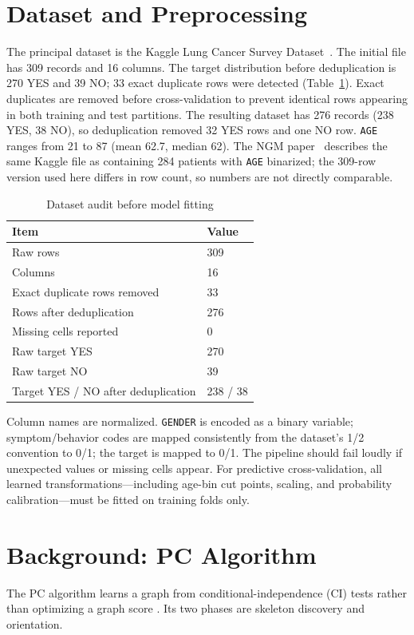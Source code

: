 \documentclass[10pt,twocolumn,letterpaper]{article}
\newcommand{\vn}[1]{{\small\texttt{#1}}}
\begin{document}
	\section{Dataset and Preprocessing}
	The principal dataset is the Kaggle Lung Cancer Survey Dataset~\cite{b2}. The initial file has 309 records and 16 columns. The target distribution before deduplication is 270 YES and 39 NO; 33 exact duplicate rows were detected (Table~\ref{tab:audit}). Exact duplicates are removed before cross-validation to prevent identical rows appearing in both training and test partitions. The resulting dataset has 276 records (238 YES, 38 NO), so deduplication removed 32 YES rows and one NO row. \vn{AGE} ranges from 21 to 87 (mean 62.7, median 62). The NGM paper~\cite{b1} describes the same Kaggle file as containing 284 patients with \vn{AGE} binarized; the 309-row version used here differs in row count, so numbers are not directly comparable.

	\begin{table}[h]\centering
		\caption{Dataset audit before model fitting}\footnotesize
		\begin{tabular}{@{}p{}p{}@{}}
			\toprule
			Item & Value\\
			\midrule
			Raw rows & 309\\
			Columns & 16\\
			Exact duplicate rows removed & 33\\
			Rows after deduplication & 276\\
			Missing cells reported & 0\\
			Raw target YES & 270\\
			Raw target NO & 39\\
			Target YES / NO after deduplication & 238 / 38\\
			\bottomrule
		\end{tabular}
		\label{tab:audit}
	\end{table}

	Column names are normalized. \vn{GENDER} is encoded as a binary variable; symptom/behavior codes are mapped consistently from the dataset's 1/2 convention to 0/1; the target is mapped to 0/1. The pipeline should fail loudly if unexpected values or missing cells appear. For predictive cross-validation, all learned transformations---including age-bin cut points, scaling, and probability calibration---must be fitted on training folds only.

	\section{Background: PC Algorithm}
	The PC algorithm learns a graph from conditional-independence (CI) tests rather than optimizing a graph score \cite{b3,b4}. Its two phases are skeleton discovery and orientation.
\end{document}
